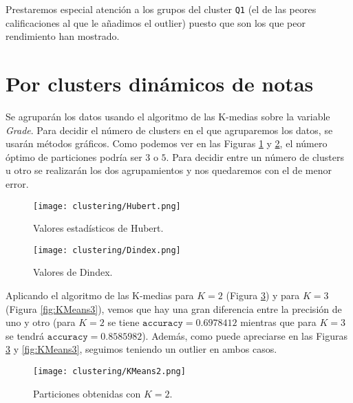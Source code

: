 Prestaremos especial atención a los grupos del cluster \texttt{Q1} (el de las peores calificaciones al que le añadimos el outlier) puesto que son los que peor rendimiento han mostrado.


\section{Por clusters dinámicos de notas}

Se agruparán los datos usando el algoritmo de las K-medias sobre la variable \emph{Grade}. Para decidir el número de clusters en el que agruparemos los datos, se usarán métodos gráficos. Como podemos ver en las Figuras \ref{fig:indiceshubert} y \ref{fig:indicesdindex}, el número óptimo de particiones podría ser $3$ o $5$. Para decidir entre un número de clusters u otro se realizarán los dos agrupamientos y nos quedaremos con el de menor error.

\begin{figure}[H]
    \centering
    \texttt{[image: clustering/Hubert.png]}
    \caption{Valores estadísticos de Hubert.}
    \label{fig:indiceshubert}
\end{figure}

\begin{figure}[H]
    \centering
    \texttt{[image: clustering/Dindex.png]}
    \caption{Valores de Dindex.}
    \label{fig:indicesdindex}
\end{figure}

Aplicando el algoritmo de las K-medias para $K = 2$ (Figura \ref{fig:KMeans2}) y para $K = 3$ (Figura \ref{fig:KMeans3}), vemos que hay una gran diferencia entre la precisión de uno y otro (para $K = 2$ se tiene $\texttt{accuracy} = 0.6978412$ mientras que para $K = 3$ se tendrá $\texttt{accuracy} = 0.8585982$). Además, como puede apreciarse en las Figuras \ref{fig:KMeans2} y \ref{fig:KMeans3}, seguimos teniendo un outlier en ambos casos.

\begin{figure}[H]
    \centering
    \texttt{[image: clustering/KMeans2.png]}
    \caption{Particiones obtenidas con $K = 2$.}
    \label{fig:KMeans2}
\end{figure}

